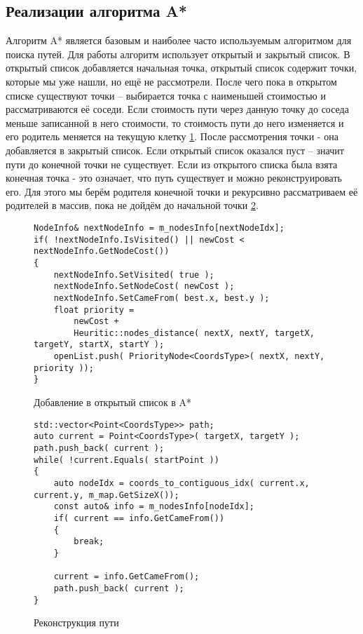 \subsection{Реализации алгоритма A*}

Алгоритм A* является базовым и наиболее часто используемым алгоритмом для поиска путей. Для работы алгоритм использует открытый и закрытый список. В открытый список добавляется начальная точка, открытый список содержит точки, которые мы уже нашли, но ещё не рассмотрели. После чего пока в открытом списке существуют точки -- выбирается точка с наименьшей стоимостью и рассматриваются её соседи. Если стоимость пути через данную точку до соседа меньше записанной в него стоимости, то стоимость пути до него изменяется и его родитель меняется на текущую клетку \cref{fig:a_star_open_list_add}. После рассмотрения точки - она добавляется в закрытый список. Если открытый список оказался пуст -- значит пути до конечной точки не существует. Если из открытого списка была взята конечная точка - это означает, что путь существует и можно реконструировать его. Для этого мы берём родителя конечной точки и рекурсивно рассматриваем её родителей в массив, пока не дойдём до начальной точки \cref{fig:a_star_reconstruct_path}.

\begin{figure}[!htb]
	\centering
	\captionsetup{justification=centering}
	\begin{lstlisting}
NodeInfo& nextNodeInfo = m_nodesInfo[nextNodeIdx];
if( !nextNodeInfo.IsVisited() || newCost < nextNodeInfo.GetNodeCost())
{
	nextNodeInfo.SetVisited( true );
	nextNodeInfo.SetNodeCost( newCost );
	nextNodeInfo.SetCameFrom( best.x, best.y );
	float priority =
		newCost +
		Heuritic::nodes_distance( nextX, nextY, targetX, targetY, startX, startY );
	openList.push( PriorityNode<CoordsType>( nextX, nextY, priority ));
}
	\end{lstlisting}
	\caption{Добавление в открытый список в A*}
	\label{fig:a_star_open_list_add}
\end{figure}

\begin{figure}[!htb]
	\centering
	\captionsetup{justification=centering}
	\begin{lstlisting}
std::vector<Point<CoordsType>> path;
auto current = Point<CoordsType>( targetX, targetY );
path.push_back( current );
while( !current.Equals( startPoint ))
{
	auto nodeIdx = coords_to_contiguous_idx( current.x, current.y, m_map.GetSizeX());
	const auto& info = m_nodesInfo[nodeIdx];
	if( current == info.GetCameFrom())
	{
		break;
	}
	
	current = info.GetCameFrom();
	path.push_back( current );
}
	\end{lstlisting}
	\caption{Реконструкция пути}
	\label{fig:a_star_reconstruct_path}
\end{figure}

